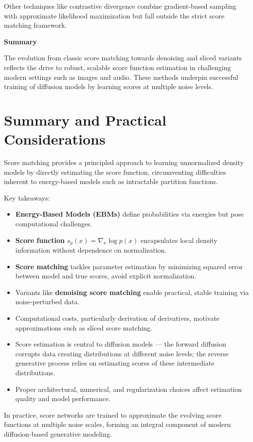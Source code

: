 Other techniques like contrastive divergence combine gradient-based sampling with approximate likelihood maximization but fall outside the strict score matching framework.

\textbf{Summary}

The evolution from classic score matching towards denoising and sliced variants reflects the drive to robust, scalable score function estimation in challenging modern settings such as images and audio. These methods underpin successful training of diffusion models by learning scores at multiple noise levels.

\section{Summary and Practical Considerations}

Score matching provides a principled approach to learning unnormalized density models by directly estimating the score function, circumventing difficulties inherent to energy-based models such as intractable partition functions.

Key takeaways:

\begin{itemize}
    \item \textbf{Energy-Based Models (EBMs)} define probabilities via energies but pose computational challenges.
    \item \textbf{Score function} \( s_p(x) = \nabla_x \log p(x) \) encapsulates local density information without dependence on normalization.
    \item \textbf{Score matching} tackles parameter estimation by minimizing squared error between model and true scores, avoid explicit normalization.
    \item Variants like \textbf{denoising score matching} enable practical, stable training via noise-perturbed data.
    \item Computational costs, particularly derivation of derivatives, motivate approximations such as sliced score matching.
    \item Score estimation is central to diffusion models — the forward diffusion corrupts data creating distributions at different noise levels; the reverse generative process relies on estimating scores of these intermediate distributions.
    \item Proper architectural, numerical, and regularization choices affect estimation quality and model performance.
\end{itemize}

In practice, score networks are trained to approximate the evolving score functions at multiple noise scales, forming an integral component of modern diffusion-based generative modeling.